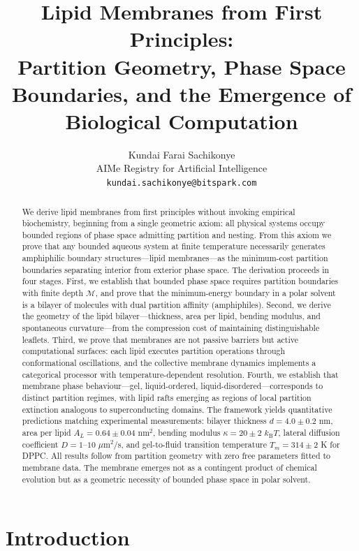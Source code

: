 \documentclass[twocolumn,10pt]{article}
\title{\textbf{Lipid Membranes from First Principles: \\Partition Geometry, Phase Space Boundaries, and the Emergence of Biological Computation}}
\author{
Kundai Farai Sachikonye\\
AIMe Registry for Artificial Intelligence\\
\texttt{kundai.sachikonye@bitspark.com}
}
\date{}
\theoremstyle{remark}
\newcommand{\kB}{k_{\mathrm{B}}}
\newcommand{\Depth}{\mathcal{M}}
\begin{document}
\maketitle

\begin{abstract}
\noindent We derive lipid membranes from first principles without invoking empirical biochemistry, beginning from a single geometric axiom: all physical systems occupy bounded regions of phase space admitting partition and nesting. From this axiom we prove that any bounded aqueous system at finite temperature necessarily generates amphiphilic boundary structures---lipid membranes---as the minimum-cost partition boundaries separating interior from exterior phase space. The derivation proceeds in four stages. First, we establish that bounded phase space requires partition boundaries with finite depth $\Depth$, and prove that the minimum-energy boundary in a polar solvent is a bilayer of molecules with dual partition affinity (amphiphiles). Second, we derive the geometry of the lipid bilayer---thickness, area per lipid, bending modulus, and spontaneous curvature---from the compression cost of maintaining distinguishable leaflets. Third, we prove that membranes are not passive barriers but active computational surfaces: each lipid executes partition operations through conformational oscillations, and the collective membrane dynamics implements a categorical processor with temperature-dependent resolution. Fourth, we establish that membrane phase behaviour---gel, liquid-ordered, liquid-disordered---corresponds to distinct partition regimes, with lipid rafts emerging as regions of local partition extinction analogous to superconducting domains. The framework yields quantitative predictions matching experimental measurements: bilayer thickness $d = 4.0 \pm 0.2$ nm, area per lipid $A_L = 0.64 \pm 0.04$ nm$^2$, bending modulus $\kappa = 20 \pm 2$ $\kB T$, lateral diffusion coefficient $D = 1$--$10$ $\mu$m$^2$/s, and gel-to-fluid transition temperature $T_m = 314 \pm 2$ K for DPPC. All results follow from partition geometry with zero free parameters fitted to membrane data. The membrane emerges not as a contingent product of chemical evolution but as a geometric necessity of bounded phase space in polar solvent.
\end{abstract}

\section{Introduction}
\label{sec:introduction}
\end{document}
